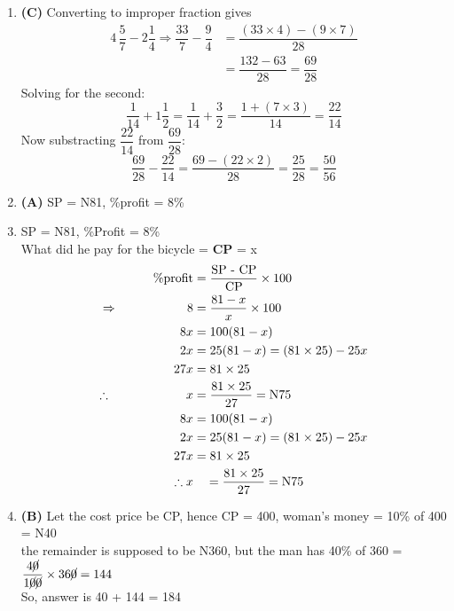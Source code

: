 \begin{multicols}{2}
\begin{enumerate}[label={\textbf{\arabic*.}}]
    \item \textbf{(C)} Converting to improper fraction gives 
        \begin{align*}
        4\,\dfrac{5}{7} - 2\dfrac{1}{4} \Rightarrow \dfrac{33}{7} - \dfrac{9}{4} &= \dfrac{(33\times 4) - (9 \times 7) }{28}  \\
        &= \dfrac{132 - 63}{28} = \dfrac{69}{28} 
        \end{align*}
        Solving for the second:
        \[\dfrac{1}{14} + 1\dfrac{1}{2} = \dfrac{1}{14} + \dfrac{3}{2} = \dfrac{1 + (7 \times 3)}{14} = \dfrac{22}{14}\] 
        Now substracting $\dfrac{22}{14}$ from $\dfrac{69}{28}$: 
        \[\dfrac{69}{28} - \dfrac{22}{14} = \dfrac{69 - (22 \times 2)}{28} =  \dfrac{25}{28} = \dfrac{50}{56}\]


    \item \textbf{(A)} SP = N81, \%profit = 8\% \\
    \item SP = N81, \%Profit = 8\% \\
    What did he pay for the bicycle = \textbf{CP} = x \\
    \begin{align*}
    \%\text{profit} &= \dfrac{ \text{SP - CP}}{\text{CP}} \times 100  \\ 
    \Rightarrow \hspace{55px} 8 &= \dfrac{81 - x }{x} \times 100 \\
     \hspace{30px} 8x &= 100(81 - x)  \\
     \hspace{30px} 2x &= 25(81 - x ) = (81\times25) -25x \\
     \hspace{30px} 27x &= 81\times 25 \\
    \therefore \hspace{60px}  x &= \dfrac{81 \times 25}{27} = \text{N}75 \\
     \hspace{50px} 8x &= 100(81 - x)  \\
     \hspace{50px} 2x &= 25(81 - x ) = (81\times25) -25x \\
     \hspace{50px} 27x &= 81\times 25 \\
    \therefore  x &\quad = \dfrac{81 \times 25}{27} = \text{N}75
    \end{align*}

    \item \textbf{(B)}  Let the cost price be CP, hence CP = 400, woman's money = 10\% of 400 = N40 \\
    the remainder is supposed to be N360, but the man has 40\% of 360 = \(\dfrac{4\cancel{0}}{1\cancel{0}\cancel{0}} \times 36\cancel{0} = 144 \) \vspace {5px}\\
    So, answer is 40 + 144 = 184


\end{enumerate}
\end{multicols}
